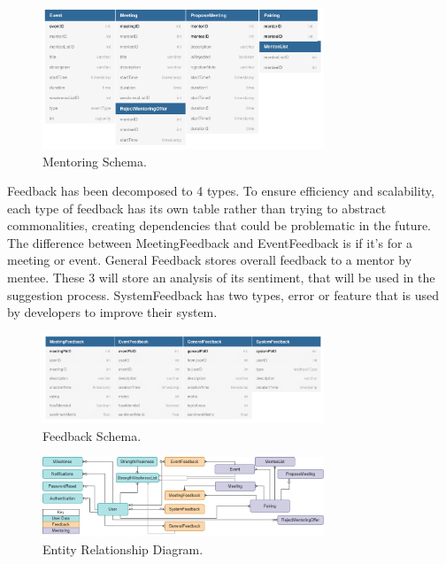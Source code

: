 \documentclass[10pt]{article}
\begin{document}
\begin{figure}[H]
    \centering
    \includegraphics[width=0.75\textwidth]{MentoringDB}
    \caption{Mentoring Schema.}
    \label{fig:Mentoring Schema}
\end{figure}

Feedback has been decomposed to 4 types. To ensure efficiency and scalability,
each type of feedback has its own table rather than trying to abstract
commonalities, creating dependencies that could be problematic in the future.
The difference between MeetingFeedback and EventFeedback is if it’s for a
meeting or event. General Feedback stores overall feedback to a mentor by
mentee. These 3 will store an analysis of its sentiment, that will be used in
the suggestion process. SystemFeedback has two types, error or feature that is
used by developers to improve their system.

\begin{figure}[H]
    \centering
    \includegraphics[width=0.75\textwidth]{FeedbackDB}
    \caption{Feedback Schema.}
    \label{fig:Feedback Schema}
\end{figure}



\begin{figure}[H]
    \centering
    \includegraphics[width=0.75\textwidth]{ER}
    \caption{Entity Relationship Diagram.}
    \label{fig:Entity Diagram}
\end{figure}
\end{document}
